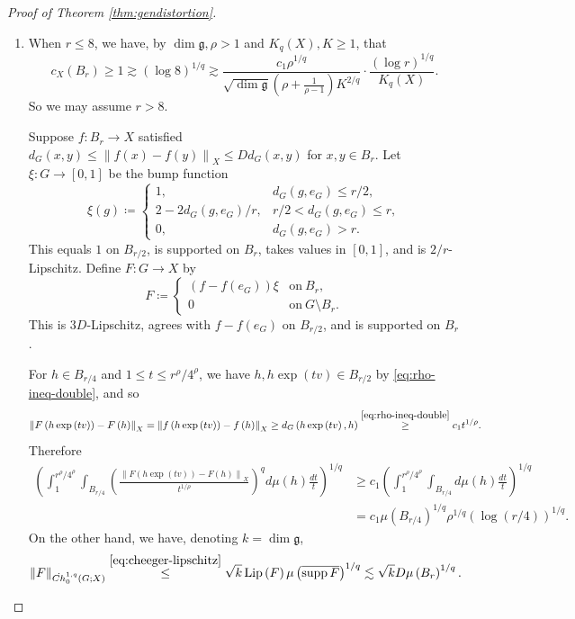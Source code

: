 \documentclass[11pt,reqno]{amsart}
\newcommand{\1}{\mathbf 1}
\begin{document}
\begin{proof}[Proof of Theorem \ref{thm:gendistortion}]\,
\begin{enumerate}
\item
When $r\le 8$, we have, by $\dim \mathfrak{g}, \rho>1$ and $K_q(X),K\ge 1$, that 
\[
c_X\left(B_r\right)\ge 1\gtrsim \left(\log 8\right)^{1/q}\gtrsim \frac{c_1\rho^{1/q}}{\sqrt{\dim \mathfrak{g}}\left(\rho+\frac{1}{\rho-1}\right)K^{2/q}}\cdot\frac{\left(\log r\right)^{1/q}}{K_q\left(X\right)}.
\]
So we may assume $r>8$.

Suppose $f:B_r\to X$ satisfied $d_G\left(x,y\right)\le \left\|f\left(x\right)-f\left(y\right)\right\|_X\le D d_G\left(x,y\right)$ for $x,y\in B_r$. Let $\xi:G\to [0,1]$ be the bump function
\[
\xi\left(g\right)\coloneqq
\begin{cases}
    1,&d_G\left(g,e_G\right)\le r/2,\\
    2-2d_G\left(g,e_G\right)/r,& r/2<d_G\left(g,e_G\right)\le r,\\
    0,&d_G\left(g,e_G\right)>r.
\end{cases}
\]
This equals $1$ on $B_{r/2}$, is supported on $B_{r}$, takes values in $\left[0,1\right]$, and is $2/r$-Lipschitz. Define $F:G\to X$ by
\[
F\coloneqq
\begin{cases}
\left(f-f\left(e_G\right)\right)\xi&\mathrm{on~}B_r,\\
0&\mathrm{on~}G\setminus B_r.
\end{cases}
\]
This is $3D$-Lipschitz, agrees with $f-f\left(e_G\right)$ on $B_{r/2}$, and is supported on $B_r$.

For $h\in B_{r/4}$ and $1\le t\le r^\rho/4^\rho$, we have $h,h\exp\left(tv\right)\in B_{r/2}$ by \eqref{eq:rho-ineq-double}, and so
\[
\left\|F\left(h\exp\left(tv\right)\right)-F\left(h\right)\right\|_X=\left\|f\left(h\exp\left(tv\right)\right)-f\left(h\right)\right\|_X\ge d_G\left(h\exp\left(tv\right),h\right)\stackrel{\eqref{eq:rho-ineq-double}}{\ge }c_1 t^{1/\rho}.
\]
Therefore
\begin{align*}
    \left(\int_1^{r^\rho/4^\rho} \int_{B_{r/4}}\left(\frac{\left\|F\left(h\exp\left(tv\right)\right)-F\left(h\right)\right\|_X}{t^{1/\rho}}\right)^qd\mu\left(h\right)\frac{dt}{t}\right)^{1/q}&\ge c_1\left(\int_1^{r^\rho/4^\rho} \int_{B_{r/4}}d\mu\left(h\right)\frac{dt}{t}\right)^{1/q}\\
    &=c_1\mu\left(B_{r/4}\right)^{1/q}\rho^{1/q}\left(\log\left(r/4\right)\right)^{1/q}.
\end{align*}
On the other hand, we have, denoting $k=\dim \mathfrak{g}$,
\[
\left\|F\right\|_{\dot{Ch}_0^{1,q}\left(G;X\right)}\stackrel{\eqref{eq:cheeger-lipschitz}}{\le} \sqrt{k}\operatorname{Lip}\left(F\right)\mu\left(\overline{\operatorname{supp}F}\right)^{1/q}\lesssim \sqrt{k}D\mu\left(B_r\right)^{1/q}.
\]


\end{enumerate}
\end{proof}
\end{document}
